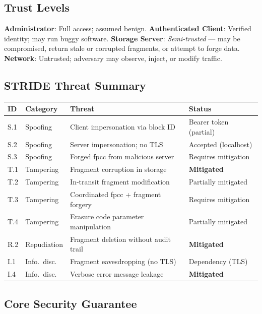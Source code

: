 \documentclass[10pt]{article}
\begin{document}
\subsection{Trust Levels}

\textbf{Administrator}: Full access; assumed benign.
\textbf{Authenticated Client}: Verified identity; may run buggy software.
\textbf{Storage Server}: \emph{Semi-trusted} — may be compromised, return stale or
corrupted fragments, or attempt to forge data.
\textbf{Network}: Untrusted; adversary may observe, inject, or modify traffic.

\subsection{STRIDE Threat Summary}

\begin{center}
\small
\begin{tabular}{llp{5.5cm}l}
\hline
\textbf{ID} & \textbf{Category} & \textbf{Threat} & \textbf{Status} \\
\hline
S.1 & Spoofing   & Client impersonation via block ID        & Bearer token (partial) \\
S.2 & Spoofing   & Server impersonation; no TLS             & Accepted (localhost) \\
S.3 & Spoofing   & Forged fpcc from malicious server        & Requires mitigation \\
T.1 & Tampering  & Fragment corruption in storage           & \textbf{Mitigated} \\
T.2 & Tampering  & In-transit fragment modification         & Partially mitigated \\
T.3 & Tampering  & Coordinated fpcc + fragment forgery      & Requires mitigation \\
T.4 & Tampering  & Erasure code parameter manipulation      & Partially mitigated \\
R.2 & Repudiation& Fragment deletion without audit trail    & \textbf{Mitigated} \\
I.1 & Info.\ disc.& Fragment eavesdropping (no TLS)        & Dependency (TLS) \\
I.4 & Info.\ disc.& Verbose error message leakage          & \textbf{Mitigated} \\
\hline
\end{tabular}
\end{center}

\subsection{Core Security Guarantee}
\end{document}
